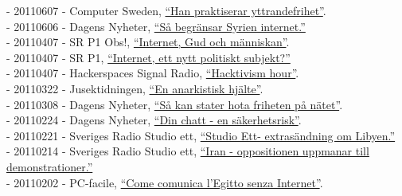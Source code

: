 \documentclass[a4paper,11pt,oneside]{article}
\begin{document}
    - 20110607 - Computer Sweden, \href{http://computersweden.idg.se/2.2683/1.388901/han-praktiserar-yttrandefrihet}{``Han praktiserar yttrandefrihet''}. \\
    - 20110606 - Dagens Nyheter, \href{http://www.dn.se/nyheter/varlden/sa-begransar-syrien-friheten-pa-internet}{``Så begränsar Syrien internet.''} \\
    - 20110407 - SR P1 Obs!, \href{http://t.sr.se/1zjt3PQ}{``Internet, Gud och människan''}. \\
    - 20110407 - SR P1, \href{http://t.sr.se/PbptWr}{``Internet, ett nytt politiskt subjekt?''} \\
    - 20110407 - Hackerspaces Signal Radio, \href{http://signal.hackerspaces.org/archive/2011-04-07-2200-hacktivism-hour.mp3}{``Hacktivism hour''}. \\
    - 20110322 - Jusektidningen, \href{http://www.tidningenkarriar.se/Arkivet/2011/3/Anarkistisk-hjalte/}{``En anarkistisk hjälte''}. \\
    - 20110308 - Dagens Nyheter, \href{http://www.dn.se/vart-internet/vart-internet-hem/sa-kan-stater-hota-friheten-pa-natet/}{``Så kan stater hota friheten på nätet''}. \\
    - 20110224 - Dagens Nyheter, \href{http://www.dn.se/vart-internet/vart-internet-hem/din-chatt-en-sakerhetsrisk/}{``Din chatt - en säkerhetsrisk''}. \\
    - 20110221 - Sveriges Radio Studio ett, \href{http://t.sr.se/1cUlHfI}{``Studio Ett- extrasändning om Libyen.''} \\
    - 20110214 - Sveriges Radio Studio ett, \href{http://t.sr.se/1D1zCXq}{``Iran - oppositionen uppmanar till demonstrationer.''} \\
    - 20110202 - PC-facile, \href{http://www.pc-facile.com/news/come_comunica_egitto_senza_internet/68959.htm}{``Come comunica l'Egitto senza Internet''}. \\
\end{document}
